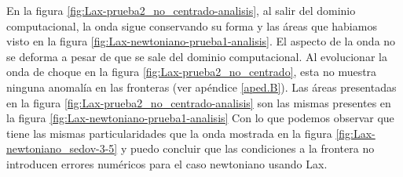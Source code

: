\documentclass[12pt,a4paper]{book}
\begin{document}

En la figura \ref{fig:Lax-prueba2_no_centrado-analisis}, al salir del dominio computacional, la onda sigue conservando su forma y las áreas que habiamos visto en la figura \ref{fig:Lax-newtoniano-prueba1-analisis}. El aspecto de la onda no se deforma a pesar de que se sale del dominio computacional. Al evolucionar la onda de choque en la figura \ref{fig:Lax-prueba2_no_centrado},  esta no muestra ninguna anomalía en las fronteras (ver apéndice \ref{aped.B}). Las áreas presentadas en la figura \ref{fig:Lax-prueba2_no_centrado-analisis} son las mismas presentes en la figura \ref{fig:Lax-newtoniano-prueba1-analisis} Con lo que podemos observar que tiene las mismas particularidades que la onda mostrada en la figura \ref{fig:Lax-newtoniano_sedov-3-5} y puedo concluir que las condiciones a la frontera no introducen errores numéricos para el caso newtoniano usando Lax.%
\end{document}
